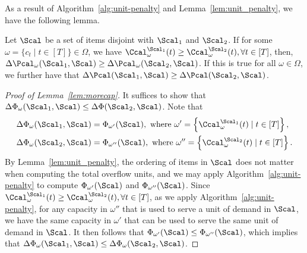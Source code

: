 As a result of Algorithm~\ref{alg:unit-penalty} and Lemma~\ref{lem:unit_penalty}, we have the following lemma.
\begin{lemma}\label{lem:morecap}
	Let ${\Scal}$ be a set of items disjoint with $\Scal_1$ and $\Scal_2$. If for some $\omega=\{c_t\mid t\in[T]\}\in\Omega$, we have $\Ccal_\omega^{\Scal_1}(t)\ge \Ccal_\omega^{\Scal_2}(t), \forall t\in[T]$, then, $\Delta\Pcal_\omega(\Scal_1,{\Scal})\ge \Delta\Pcal_\omega(\Scal_2,{\Scal})$. If this is true for all $\omega\in \Omega$, we further have that $\Delta\Pcal(\Scal_1,{\Scal})\ge \Delta\Pcal(\Scal_2,{\Scal})$.		
\end{lemma}
\begin{proof}[Proof of Lemma~\ref{lem:morecap}]
It suffices to show that $\Delta\Phi_\omega(\Scal_1,\Scal) \le \Delta\Phi(\Scal_2,\Scal)$. Note that 
\begin{align*}
    \Delta\Phi_\omega(\Scal_1,\Scal) &= \Phi_{\omega'}(\Scal), \text{ where }\omega' =\left\{\Ccal^{\Scal_1}_\omega(t)\mid t\in[T]\right\},\\
    \Delta\Phi_\omega(\Scal_2,\Scal) &= \Phi_{\omega''}(\Scal), \text{ where }\omega'' =\left\{\Ccal^{\Scal_2}_\omega(t)\mid t\in[T]\right\}.
\end{align*}
By Lemma~\ref{lem:unit_penalty}, the ordering of items in $\Scal$ does not matter when computing the total overflow units, and we may apply Algorithm~\ref{alg:unit-penalty} to compute $\Phi_{\omega'}(\Scal)$ and $\Phi_{\omega''}(\Scal)$. Since $\Ccal_\omega^{\Scal_1}(t)\ge \Ccal_\omega^{\Scal_2}(t), \forall t\in[T]$, as we apply Algorithm~\ref{alg:unit-penalty}, for any capacity in $\omega''$ that is used to serve a unit of demand in $\Scal$, we have the same capacity in $\omega'$ that can be used to serve the same unit of demand in $\Scal$. It then follows that $\Phi_{\omega'}(\Scal) \le \Phi_{\omega''}(\Scal)$, which implies that $\Delta\Phi_\omega(\Scal_1,\Scal)\le \Delta\Phi_\omega(\Scal_2,\Scal)$.
\end{proof}


